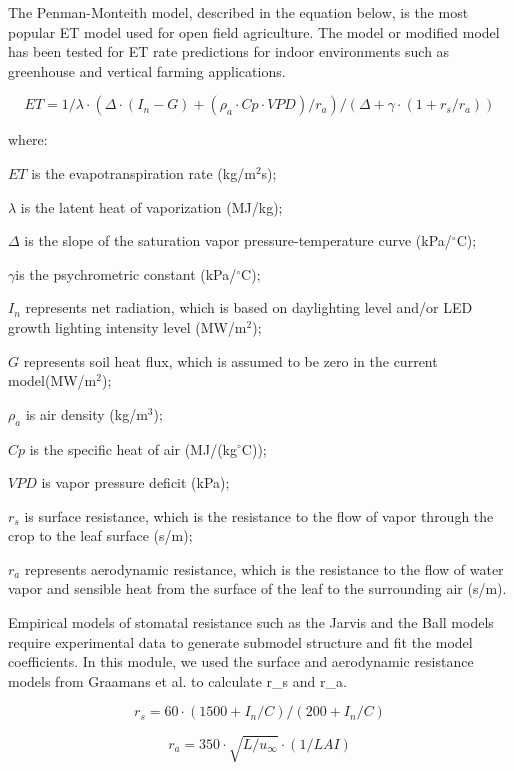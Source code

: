 The Penman-Monteith model, described in the equation below,  is the most popular ET model used for open field agriculture. The model or modified model has been tested for ET rate predictions for indoor environments such as greenhouse and vertical farming applications. 

\begin{equation}
ET=1/\lambda \cdot (\Delta \cdot(I_n-G)+(\rho_a \cdot Cp \cdot VPD)/r_a )/(\Delta+\gamma \cdot (1+r_s/r_a ) )
\end{equation}

where:

\(ET\) is the evapotranspiration rate (kg/m\(^2\)s);
 
\(\lambda\) is the latent heat of vaporization (MJ/kg); 

\(\Delta\) is the slope of the saturation vapor pressure-temperature curve (kPa/\(^{\circ}\)C); 

\(\gamma\)is the psychrometric constant (kPa/\(^{\circ}\)C);

\(I_n\) represents net radiation, which is based on daylighting level and/or LED growth lighting intensity level (MW/m\(^2\));

\(G\) represents soil heat flux, which is assumed to be zero in the current model(MW/m\(^2\));

\(\rho_a\) is air density (kg/m\(^3\));

\(Cp\) is the specific heat of air (MJ/(kg\(^{\circ}\)C));

\(VPD\) is vapor pressure deficit (kPa);

\(r_s\) is surface resistance, which is the resistance to the flow of vapor through the crop to the leaf surface (s/m); 

\(r_a\) represents aerodynamic resistance, which is the resistance to the flow of water vapor and sensible heat from the surface of the leaf to the surrounding air (s/m).

Empirical models of stomatal resistance such as the Jarvis and the Ball models require experimental data to generate submodel structure and fit the model coefficients.  In this module, we used the surface and aerodynamic resistance models from Graamans et al. to calculate r_s and r_a. 

\begin{equation}
r_s=60 \cdot (1500+I_n/C)/(200+I_n/C) 
\end{equation}

\begin{equation}
r_a=350 \cdot \sqrt{L/u_\infty} \cdot (1/LAI)
\end{equation}

